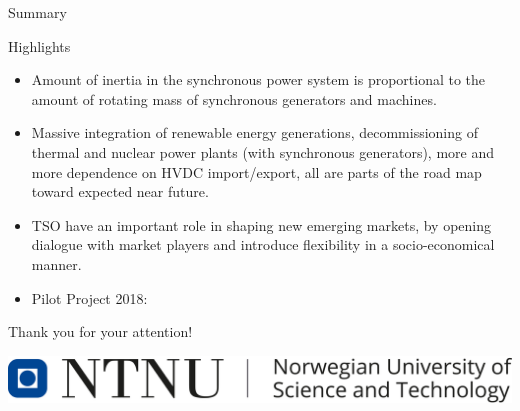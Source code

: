 \documentclass{beamer}
\begin{document}
\begin{frame}{Summary}
\begin{block}{Highlights}
{\scriptsize
\begin{itemize}
\item<1-> Amount of inertia in the synchronous power system is proportional to the amount of rotating mass of synchronous generators and machines.
\item<2-> Massive integration of renewable energy generations, decommissioning of thermal and nuclear power plants (with synchronous generators), more and more dependence on HVDC import/export, all are parts of the road map toward expected near future.
\item<3-> TSO have an important role in shaping new emerging markets, by opening dialogue with market players and introduce flexibility in a socio-economical manner.
\item<4-> Pilot Project 2018:
\end{itemize}
}
\end{block}
\end{frame}

\begin{frame}
\centering
Thank you for your attention!\\
		\vskip 0.8cm

\centering
\includegraphics[scale=0.2]{ntnulogo_eng.png}
\end{frame} 
\end{document}

